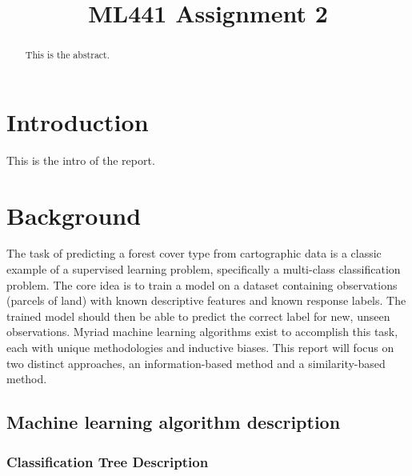 \documentclass[conference]{IEEEtran}
\begin{document}
\title{ML441 Assignment 2}

\author{
}

\maketitle

\begin{abstract}
This is the abstract.
\end{abstract}


\section{Introduction}
This is the intro of the report.

\section{Background}

The task of predicting a forest cover type from cartographic data is a classic example of a supervised learning problem, specifically a multi-class classification problem. The core idea is to train a model on a dataset containing observations (parcels of land) with known descriptive features and known response labels. The trained model should then be able to predict the correct label for new, unseen observations. Myriad machine learning algorithms exist to accomplish this task, each with unique methodologies and inductive biases. This report will focus on two distinct approaches, an information-based method and a similarity-based method. 

\subsection{Machine learning algorithm description}

\subsubsection{Classification Tree Description}
\end{document}
